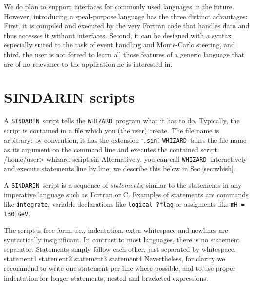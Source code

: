 \documentclass[12pt]{book}
\newenvironment{interaction}%
  {\begingroup\small
   \verbatim}%
  {\endverbatim
   \endgroup\noindent}
\newenvironment{code}%
  {\begingroup\footnotesize
   \quote
   \verbatim}%
  {\endverbatim
   \endquote
   \endgroup\noindent}
\newcommand{\ttt}[1]{\texttt{#1}}
\newcommand{\whizard}{\texttt{WHIZARD}}
\newcommand{\sindarin}{\texttt{SINDARIN}}
\begin{document}
We do plan to support interfaces for commonly used languages in the future.
However, introducing a speal-purpose language has the three distinct
advantages: First, it is compiled and executed by the very Fortran code that
handles data and thus accesses it without interfaces.  Second, it can be
designed with a syntax especially suited to the task of event handling and
Monte-Carlo steering, and third, the user is not forced to learn all those
features of a generic language that are of no relevance to the application he
is interested in.


\section{SINDARIN scripts}

A \sindarin\ script tells the \whizard\ program what it has to do.  Typically,
the script is contained in a file which you (the user) create.  The file name
is arbitrary; by convention, it has the extension `\verb|.sin|'.
\whizard\ takes the file name as its argument on the command line and
executes the contained script:
\begin{interaction}
/home/user> whizard script.sin
\end{interaction}
Alternatively, you can call \whizard\ interactively and execute
statements line by line; we describe this below in Sec.\ref{sec:whish}.

A \sindarin\ script is a sequence of \emph{statements}, similar to the
statements in any imperative language such as Fortran or C.  Examples
of statements are commands like \ttt{integrate}, variable declarations
like \ttt{logical ?flag} or assigments like \ttt{mH = 130 GeV}.

The script is free-form, i.e., indentation, extra whitespace and
newlines are syntactically insignificant.  In contrast to most
languages, there is no statement separator.  Statements simply follow each
other, just separated by whitespace.  
\begin{code}
statement1 statement2
statement3
               statement4
\end{code}
Nevertheless, for clarity we recommend to
write one statement per line where possible, and to use proper
indentation for longer statements, nested and bracketed expressions.
\end{document}
